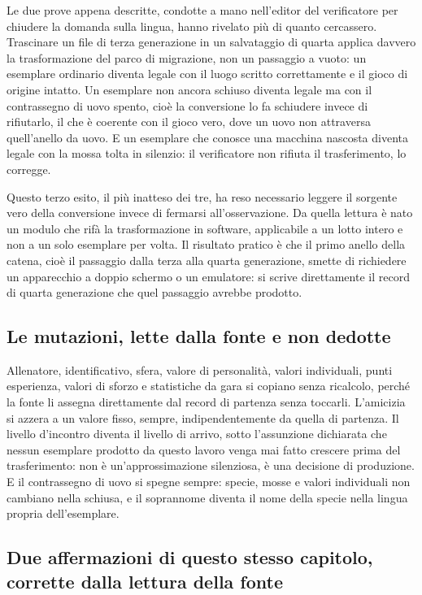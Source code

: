 Le due prove appena descritte, condotte a mano nell'editor del verificatore per chiudere la domanda sulla lingua, hanno rivelato più di quanto cercassero. Trascinare un file di terza generazione in un salvataggio di quarta applica davvero la trasformazione del parco di migrazione, non un passaggio a vuoto: un esemplare ordinario diventa legale con il luogo scritto correttamente e il gioco di origine intatto. Un esemplare non ancora schiuso diventa legale ma con il contrassegno di uovo spento, cioè la conversione lo fa schiudere invece di rifiutarlo, il che è coerente con il gioco vero, dove un uovo non attraversa quell'anello da uovo. E un esemplare che conosce una macchina nascosta diventa legale con la mossa tolta in silenzio: il verificatore non rifiuta il trasferimento, lo corregge.

Questo terzo esito, il più inatteso dei tre, ha reso necessario leggere il sorgente vero della conversione invece di fermarsi all'osservazione. Da quella lettura è nato un modulo che rifà la trasformazione in software, applicabile a un lotto intero e non a un solo esemplare per volta. Il risultato pratico è che il primo anello della catena, cioè il passaggio dalla terza alla quarta generazione, smette di richiedere un apparecchio a doppio schermo o un emulatore: si scrive direttamente il record di quarta generazione che quel passaggio avrebbe prodotto.

\subsection{Le mutazioni, lette dalla fonte e non dedotte}

Allenatore, identificativo, sfera, valore di personalità, valori individuali, punti esperienza, valori di sforzo e statistiche da gara si copiano senza ricalcolo, perché la fonte li assegna direttamente dal record di partenza senza toccarli. L'amicizia si azzera a un valore fisso, sempre, indipendentemente da quella di partenza. Il livello d'incontro diventa il livello di arrivo, sotto l'assunzione dichiarata che nessun esemplare prodotto da questo lavoro venga mai fatto crescere prima del trasferimento: non è un'approssimazione silenziosa, è una decisione di produzione. E il contrassegno di uovo si spegne sempre: specie, mosse e valori individuali non cambiano nella schiusa, e il soprannome diventa il nome della specie nella lingua propria dell'esemplare.

\subsection{Due affermazioni di questo stesso capitolo, corrette dalla lettura della fonte}

